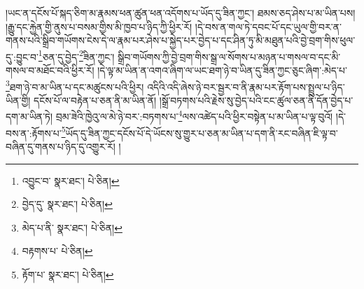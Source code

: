 །ཡང་ན་དངོས་པོ་སྐད་ཅིག་མ་རྣམས་ཕན་ཚུན་ཕན་འདོགས་པ་ཡོད་དུ་ཟིན་ཀྱང་། ཐམས་ཅད་ཤེས་པ་མ་ཡིན་པས། །རྒྱུ་དང་རྐྱེན་གྱི་ནུས་པ་བསམ་གྱིས་མི་ཁྱབ་པ་ཉིད་ཀྱི་ཕྱིར་རོ། །དེ་བས་ན་གལ་ཏེ་དབང་པོ་དང་ཡུལ་གྱི་བར་ན་གནས་པའི་སྒྲིབ་གཡོགས་ངེས་དེ་ལ་རྣམ་པར་ཤེས་པ་སྐྱེད་པར་བྱེད་པ་དང་ཤིན་ཏུ་མི་མཐུན་པའི་བྱེ་བྲག་གིས་ཕུལ་དུ་:བྱུང་བ་\footnote{འབྱུང་བ་  སྣར་ཐང་།  པེ་ཅིན། }ཅན་དུ་བྱེད་\footnote{བྱེད་དུ་  སྣར་ཐང་།  པེ་ཅིན། }ཟིན་ཀྱང་། སྒྲིབ་གཡོགས་ཀྱི་བྱེ་བྲག་གིས་སྒྲ་ལ་སོགས་པ་མཉན་པ་གསལ་བ་དང་མི་གསལ་བ་མཐོང་བའི་ཕྱིར་རོ། །དེ་ལྟ་མ་ཡིན་ན་འགའ་ཞིག་ལ་ཡང་ཐག་ཉེ་བ་ཡིན་དུ་ཟིན་ཀྱང་ཅུང་ཞིག་:མེད་པ་\footnote{མེད་པ་ནི་  སྣར་ཐང་།  པེ་ཅིན། }ཐག་ཉེ་བ་མ་ཡིན་པ་དང་མཚུངས་པའི་ཕྱིར། འདིའི་འདི་ཞེས་ཉེ་བར་སྦྱར་བ་ནི་རྣམ་པར་རྟོག་པས་སྤྲུལ་པ་ཉིད་ཡིན་གྱི། དངོས་པོ་ལ་བརྟེན་པ་ཅན་ནི་མ་ཡིན་ནོ། །སྒྲོ་བཏགས་པའི་རྗེས་སུ་བྱེད་པའི་ངང་ཚུལ་ཅན་ནི་དོན་བྱེད་པ་དག་མ་ཡིན་ཏེ། བྲམ་ཟེའི་ཁྱེའུ་ལ་མེ་ཉེ་བར་:བཏགས་པ་\footnote{བརྟགས་པ་  པེ་ཅིན། }ལས་འཚེད་པའི་ཕྱིར་བསྟེན་པ་མ་ཡིན་པ་ལྟ་བུའོ། །དེ་བས་ན་:རྟོགས་པ་\footnote{རྟོག་པ་  སྣར་ཐང་།  པེ་ཅིན། }ཡོད་དུ་ཟིན་ཀྱང་དངོས་པོ་དེ་ཡོངས་སུ་གྱུར་པ་ཅན་མ་ཡིན་པ་དག་ནི་རང་བཞིན་ཇི་ལྟ་བ་བཞིན་དུ་གནས་པ་ཉིད་དུ་འགྱུར་རོ། །
